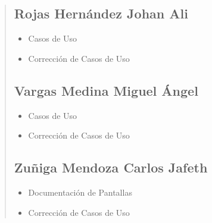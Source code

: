 \documentclass[14pt]{article}
\begin{document}
\begin{quote}
        \subsection{Rojas Hernández Johan Ali}
            \begin{itemize}
                \item Casos de Uso
                \item Corrección de Casos de Uso
            \end{itemize}
        \subsection{Vargas Medina Miguel Ángel}
            \begin{itemize}
                \item Casos de Uso
                \item Corrección de Casos de Uso
            \end{itemize}
        \subsection{Zuñiga Mendoza Carlos Jafeth}
            \begin{itemize}
                \item Documentación de Pantallas
                \item Corrección de Casos de Uso
            \end{itemize}
        \end{quote}
\end{document}
